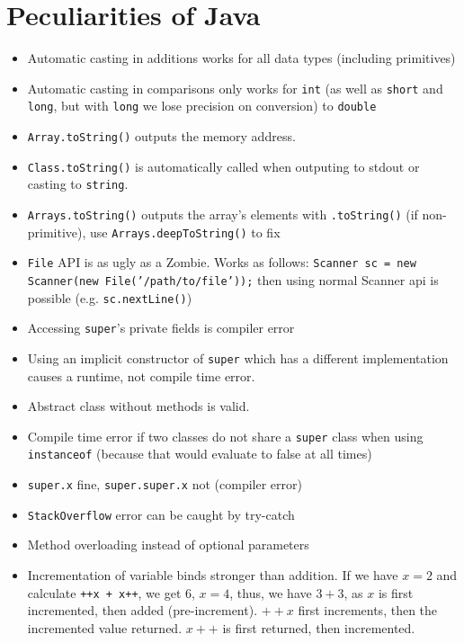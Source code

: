\newsection
\section{Peculiarities of Java}

\begin{itemize}
    \item Automatic casting in additions works for all data types (including primitives)
    \item Automatic casting in comparisons only works for \texttt{int} (as well as \texttt{short} and \texttt{long}, but with \texttt{long} we lose precision on conversion) to \texttt{double}
    \item \texttt{Array.toString()} outputs the memory address.
    \item \texttt{Class.toString()} is automatically called when outputing to stdout or casting to \texttt{string}.
    \item \texttt{Arrays.toString()} outputs the array's elements with \texttt{.toString()} (if non-primitive), use \texttt{Arrays.deepToString()} to fix
    \item \texttt{File} API is as ugly as a Zombie. Works as follows: \texttt{Scanner sc = new Scanner(new File('/path/to/file'));} then using normal Scanner api is possible (e.g. \texttt{sc.nextLine()})
    \item Accessing \texttt{super}'s private fields is compiler error
    \item Using an implicit constructor of \texttt{super} which has a different implementation causes a runtime, not compile time error.
    \item Abstract class without methods is valid.
    \item Compile time error if two classes do not share a \texttt{super} class when using \texttt{instanceof} (because that would evaluate to false at all times)
    \item \texttt{super.x} fine, \texttt{super.super.x} not (compiler error)
    \item \texttt{StackOverflow} error can be caught by try-catch
    \item Method overloading instead of optional parameters
    \item Incrementation of variable binds stronger than addition. If we have $x = 2$ and calculate \texttt{++x + x++}, we get $6$, $x = 4$, thus, we have $3 + 3$, as $x$ is first incremented, then added (pre-increment). $++x$ first increments, then the incremented value returned. $x++$ is first returned, then incremented.

\end{itemize}
